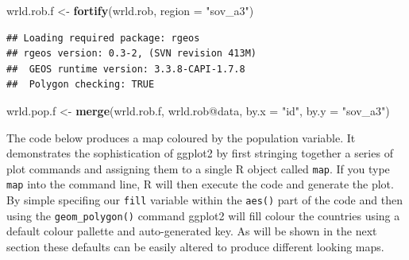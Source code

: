 \documentclass[]{article}
\newenvironment{Shaded}{}{}
\newcommand{\KeywordTok}[1]{\textcolor[rgb]{0.00,0.44,0.13}{\textbf{{#1}}}}
\newcommand{\DataTypeTok}[1]{\textcolor[rgb]{0.56,0.13,0.00}{{#1}}}
\newcommand{\StringTok}[1]{\textcolor[rgb]{0.25,0.44,0.63}{{#1}}}
\newcommand{\NormalTok}[1]{{#1}}
\begin{document}
\begin{Shaded}
\begin{Highlighting}[]
\NormalTok{wrld.rob.f <- }\KeywordTok{fortify}\NormalTok{(wrld.rob, }\DataTypeTok{region =} \StringTok{"sov_a3"}\NormalTok{)}
\end{Highlighting}
\end{Shaded}
\begin{verbatim}
## Loading required package: rgeos
## rgeos version: 0.3-2, (SVN revision 413M)
##  GEOS runtime version: 3.3.8-CAPI-1.7.8 
##  Polygon checking: TRUE
\end{verbatim}
\begin{Shaded}
\begin{Highlighting}[]

\NormalTok{wrld.pop.f <- }\KeywordTok{merge}\NormalTok{(wrld.rob.f, wrld.rob@data, }\DataTypeTok{by.x =} \StringTok{"id"}\NormalTok{, }\DataTypeTok{by.y =} \StringTok{"sov_a3"}\NormalTok{)}
\end{Highlighting}
\end{Shaded}
The code below produces a map coloured by the population variable. It
demonstrates the sophistication of ggplot2 by first stringing together a
series of plot commands and assigning them to a single R object called
\texttt{map}. If you type \texttt{map} into the command line, R will
then execute the code and generate the plot. By simple specifing our
\texttt{fill} variable within the \texttt{aes()} part of the code and
then using the \texttt{geom\_polygon()} command ggplot2 will fill colour
the countries using a default colour pallette and auto-generated key. As
will be shown in the next section these defaults can be easily altered
to produce different looking maps.
\end{document}
